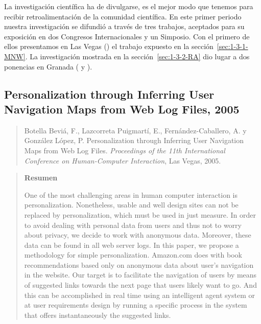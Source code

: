 La investigación científica ha de divulgarse, es el mejor modo que tenemos para recibir retroalimentación de la comunidad científica. En este primer periodo nuestra investigación se difundió a través de tres trabajos, aceptados para su exposición en dos Congresos Internacionales y un Simposio. Con el primero de ellos presentamos en Las Vegas () el trabajo expuesto en la sección~\ref{sec:1-3-1-MNW}. La investigación mostrada en la sección~\ref{sec:1-3-2-RA} dio lugar a dos ponencias en Granada ( y ).



\subsection*{Personalization through Inferring User Navigation Maps from Web Log Files, 2005}
\label{sec:nuestro-Personalization-2005}

\begin{quote}
  Botella Beviá, F., Lazcorreta Puigmartí, E., Fernández-Caballero, A. y González López, P. Personalization through Inferring User Navigation Maps from Web Log Files. \emph{Proceedings of the 11th International Conference on Human-Computer Interaction}, Las Vegas, 2005.  
\end{quote}

\begin{quotation}
	\noindent\textbf{Resumen}

	\nopagebreak One of the most challenging areas in human computer interaction is personalization. Nonetheless, usable and well design sites can not be replaced by personalization, which must be used in just measure. In order to avoid dealing with personal data from users and thus not to worry about privacy, we decide to work with anonymous data. Moreover, these data can be found in all web server logs. In this paper, we propose a methodology for simple personalization. Amazon.com does with book recommendations based only on anonymous data about user's navigation in the website. Our target is to facilitate the navigation of users by means of suggested links towards the next page that users likely want to go. And this can be accomplished in real time using an intelligent agent system or at user requirements design by running a specific process in the system that offers instantaneously the suggested links.
\end{quotation}





